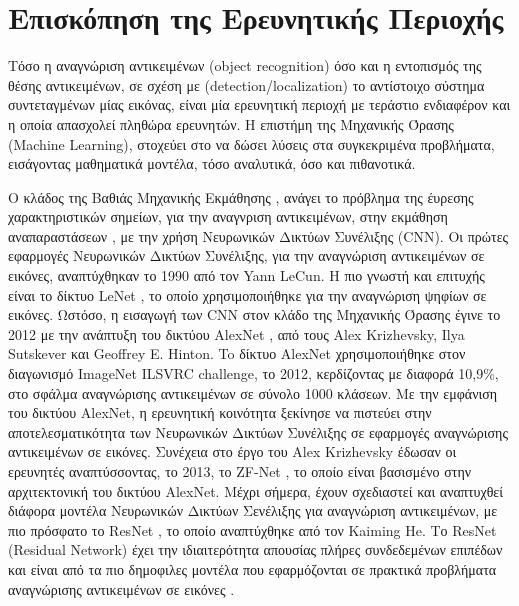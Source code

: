 \chapter{Επισκόπηση της Ερευνητικής Περιοχής}
\label{chapter:sota}
Τόσο η αναγνώριση αντικειμένων (object recognition) όσο και η εντοπισμός
της θέσης αντικειμένων, σε σχέση με (detection/localization)
το αντίστοιχο σύστημα συντεταγμένων μίας εικόνας, είναι μία ερευνητική περιοχή με τεράστιο ενδιαφέρον και
η οποία απασχολεί πληθώρα ερευνητών. Η επιστήμη της Μηχανικής Όρασης (Machine Learning),
στοχεύει στο να δώσει λύσεις στα συγκεκριμένα προβλήματα, εισάγοντας μαθηματικά
μοντέλα, τόσο αναλυτικά, όσο και πιθανοτικά.

O κλάδος της Βαθιάς Μηχανικής Εκμάθησης \cite{Goodfellow-et-al-2016-Book},
ανάγει το πρόβλημα της έυρεσης χαρακτηριστικών σημείων, για την αναγνριση αντικειμένων,
στην εκμάθηση αναπαραστάσεων \cite{bengio2013representation}, με την χρήση Νευρωνικών Δικτύων Συνέλιξης (CNN).
Οι πρώτες εφαρμογές Νευρωνικών Δικτύων Συνέλιξης, για την αναγνώριση αντικειμένων
σε εικόνες, αναπτύχθηκαν το 1990 από τον Yann LeCun.
Η πιο γνωστή και επιτυχής είναι το δίκτυο LeNet \cite{lecun1998gradient}, το οποίο
χρησιμοποιήθηκε για την αναγνώριση ψηφίων σε εικόνες.
Ωστόσο, η εισαγωγή των CNN στον κλάδο της Μηχανικής Όρασης έγινε το 2012 με
την ανάπτυξη του δικτύου AlexNet \cite{NIPS2012_4824}, από τους Alex Krizhevsky,
Ilya Sutskever και Geoffrey E. Hinton. To δίκτυο AlexNet χρησιμοποιήθηκε
στον διαγωνισμό ImageNet ILSVRC challenge, το 2012, κερδίζοντας με διαφορά
10,9\%, στο σφάλμα αναγνώρισης αντικειμένων σε σύνολο 1000 κλάσεων.
Με την εμφάνιση του δικτύου AlexNet, η ερευνητική κοινότητα ξεκίνησε να
πιστεύει στην αποτελεσματικότητα των Νευρωνικών Δικτύων Συνέλιξης σε εφαρμογές αναγνώρισης \\
αντικειμένων σε εικόνες. Συνέχεια στο έργο του Alex Krizhevsky έδωσαν οι \\
ερευνητές αναπτύσσοντας, το 2013, το ZF-Net \cite{DBLP:journals/corr/ZeilerF13}, το οποίο είναι
βασισμένο στην αρχιτεκτονική του δικτύου AlexNet. Μέχρι σήμερα, έχουν σχεδιαστεί
και αναπτυχθεί διάφορα μοντέλα Νευρωνικών Δικτύων Σενέλιξης για
αναγνώριση αντικειμένων, με πιο πρόσφατο το ResNet \cite{DBLP:journals/corr/HeZRS15},
το οποίο αναπτύχθηκε από τον Kaiming He. Το ResNet (Residual Network) έχει την
ιδιαιτερότητα απουσίας πλήρες συνδεδεμένων επιπέδων και είναι από τα πιο δημοφιλες
μοντέλα που εφαρμόζονται σε πρακτικά προβλήματα αναγνώρισης αντικειμένων σε
εικόνες \cite{DBLP:journals/corr/HeZR016}.

